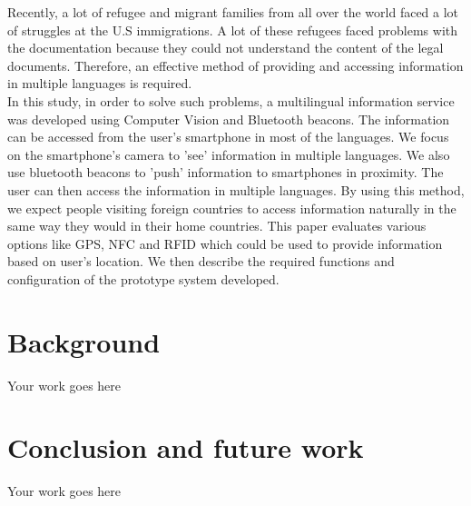 \documentclass[12pt]{article}
\begin{document}
Recently, a lot of refugee and migrant families from all over the world faced a lot of struggles at the U.S immigrations. A lot of these refugees faced problems with the documentation because they could not understand the content of the legal documents. Therefore, an effective method of providing and accessing information in multiple languages is required. \\

In this study, in order to solve such problems, a multilingual information service was developed using Computer Vision and Bluetooth beacons. The information can be accessed from the user's smartphone in most of the languages. We focus on the smartphone's camera to 'see' information in multiple languages. We also use bluetooth beacons to 'push' information to smartphones in proximity. The user can then access the information in multiple languages. By using this method, we expect people visiting foreign countries to access information naturally in the same way they would in their home countries. This paper evaluates various options like GPS, NFC and RFID which could be used to provide information based on user's location. We then describe the required functions and configuration of the prototype system developed. \\




\section{Background}
\label{sect-background}
Your work goes here

\section{Conclusion and future work}
\label{sect-conclusion}
Your work goes here

\cleardoublepage
{}


\end{document}
